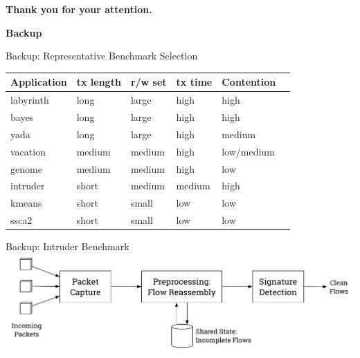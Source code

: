\documentclass[aspectratio=169, usenames, dvipsnames]{beamer}
\begin{document}
\begin{frame}
  \centering
  \huge
  \alert{\textbf{Thank you for your attention.}}
\end{frame}


\begin{frame}
  \centering
  \huge
  \alert{\textbf{Backup}}
\end{frame}

\begin{frame}{Backup: Representative Benchmark Selection}
    \centering
    \begin{tabular}{|l|l|l|l|l|l|}
        \hline
        \textbf{Application} & \textbf{tx length} & \textbf{r/w set} & \textbf{tx time} & \textbf{Contention}\\\hline\hline
        labyrinth & long & large & high & high\\\hline
        bayes & long & large & high & high\\\hline
        yada & long & large & high & medium\\\hline
        vacation & medium & medium & high & low/medium\\\hline
        genome & medium & medium & high & low\\\hline
        intruder & short & medium & medium & high\\\hline
        kmeans & short & small & low & low\\\hline
        ssca2 & short & small & low & low\\\hline
    \end{tabular}
\end{frame}

\begin{frame}{Backup: Intruder Benchmark}
    \centering
    \includegraphics[width=\textwidth,keepaspectratio]{img/experiments-intruder}
\end{frame}
\end{document}
